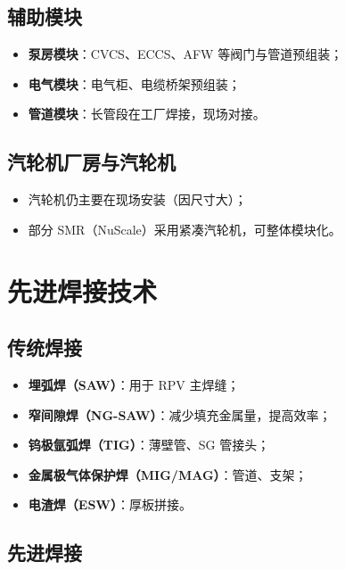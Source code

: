 \documentclass[
  UTF8,
  scheme=plain,
  fontsize=10pt,
  openany
]{ctexbook}
\begin{document}
\subsection{辅助模块}\label{ux8f85ux52a9ux6a21ux5757}

\begin{itemize}
\tightlist
\item
  \textbf{泵房模块}：CVCS、ECCS、AFW 等阀门与管道预组装；
\item
  \textbf{电气模块}：电气柜、电缆桥架预组装；
\item
  \textbf{管道模块}：长管段在工厂焊接，现场对接。
\end{itemize}

\subsection{汽轮机厂房与汽轮机}\label{ux6c7dux8f6eux673aux5382ux623fux4e0eux6c7dux8f6eux673a}

\begin{itemize}
\tightlist
\item
  汽轮机仍主要在现场安装（因尺寸大）；
\item
  部分 SMR（NuScale）采用紧凑汽轮机，可整体模块化。
\end{itemize}

\section{先进焊接技术}\label{ux5148ux8fdbux710aux63a5ux6280ux672f}

\subsection{传统焊接}\label{ux4f20ux7edfux710aux63a5}

\begin{itemize}
\tightlist
\item
  \textbf{埋弧焊（SAW）}：用于 RPV 主焊缝；
\item
  \textbf{窄间隙焊（NG-SAW）}：减少填充金属量，提高效率；
\item
  \textbf{钨极氩弧焊（TIG）}：薄壁管、SG 管接头；
\item
  \textbf{金属极气体保护焊（MIG/MAG）}：管道、支架；
\item
  \textbf{电渣焊（ESW）}：厚板拼接。
\end{itemize}

\subsection{先进焊接}\label{ux5148ux8fdbux710aux63a5}
\end{document}
